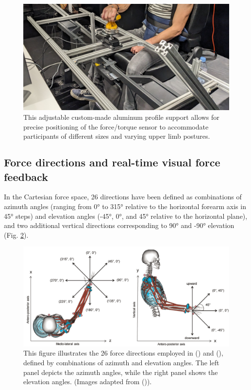 \begin{figure}[!htb]
    \captionsetup{justification=centering}
    \centering
    \includegraphics[clip, width=0.8\linewidth]{img/chapter_5/mounted_table.jpg}
    \caption{This adjustable custom-made aluminum profile support allows for precise positioning of the force/torque sensor to accommodate participants of different sizes and varying upper limb postures.}
    \label{fig:mounted_table}
\end{figure}

\subsection{Force directions and real-time visual force feedback}
In the Cartesian force space, 26 directions have been defined as combinations of azimuth angles (ranging from 0° to 315° relative to the horizontal forearm axis in 45° steps) and elevation angles (-45°, 0°, and 45° relative to the horizontal plane), and two additional vertical directions corresponding to 90° and -90° elevation (Fig. \ref{fig:rezzoug_hernandez_directions_}).

\begin{figure}[!htb]
    \captionsetup{justification=centering}
        \centering
        \includegraphics[trim={0 0 0 0},clip,width=0.9\linewidth]{img/chapter_1/axis_hernandez_rezzoug.png}
    \caption{This figure illustrates the 26 force directions employed in (\cite{rezzougUpperLimbIsometricForce2021b}) and (\cite{hernandezIsometricForceCapabilities2015}), defined by combinations of azimuth and elevation angles. The left panel depicts the azimuth angles, while the right panel shows the elevation angles. (Images adapted from (\cite{hernandezIsometricForceCapabilities2015})).}
    \label{fig:rezzoug_hernandez_directions_}
\end{figure}

